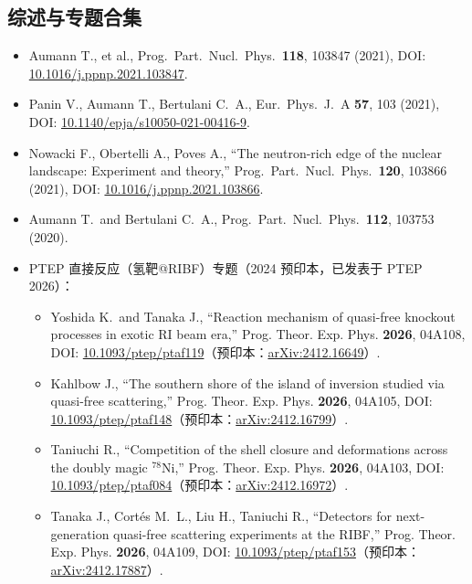 \documentclass[a4paper, 11pt]{article}
\begin{document}
\subsection{综述与专题合集}
\begin{itemize}
  \item Aumann T., et al., Prog.\ Part.\ Nucl.\ Phys.\ \textbf{118}, 103847 (2021), DOI: \href{https://doi.org/10.1016/j.ppnp.2021.103847}{10.1016/j.ppnp.2021.103847}.
  \item Panin V., Aumann T., Bertulani C.\ A., Eur.\ Phys.\ J.\ A \textbf{57}, 103 (2021), DOI: \href{https://doi.org/10.1140/epja/s10050-021-00416-9}{10.1140/epja/s10050-021-00416-9}.
  \item Nowacki F., Obertelli A., Poves A., ``The neutron-rich edge of the nuclear landscape: Experiment and theory,'' Prog.\ Part.\ Nucl.\ Phys.\ \textbf{120}, 103866 (2021), DOI: \href{https://doi.org/10.1016/j.ppnp.2021.103866}{10.1016/j.ppnp.2021.103866}.
  \item Aumann T.\ and Bertulani C.\ A., Prog.\ Part.\ Nucl.\ Phys.\ \textbf{112}, 103753 (2020).
  \item PTEP 直接反应（氢靶@RIBF）专题（2024 预印本，已发表于 PTEP 2026）：
  \begin{itemize}
    \item Yoshida K.\ and Tanaka J., ``Reaction mechanism of quasi-free knockout processes in exotic RI beam era,'' Prog. Theor. Exp. Phys. \textbf{2026}, 04A108, DOI: \href{https://doi.org/10.1093/ptep/ptaf119}{10.1093/ptep/ptaf119}（预印本：\href{https://arxiv.org/abs/2412.16649}{arXiv:2412.16649}）.
    \item Kahlbow J., ``The southern shore of the island of inversion studied via quasi-free scattering,'' Prog. Theor. Exp. Phys. \textbf{2026}, 04A105, DOI: \href{https://doi.org/10.1093/ptep/ptaf148}{10.1093/ptep/ptaf148}（预印本：\href{https://arxiv.org/abs/2412.16799}{arXiv:2412.16799}）.
    \item Taniuchi R., ``Competition of the shell closure and deformations across the doubly magic $^{78}$Ni,'' Prog. Theor. Exp. Phys. \textbf{2026}, 04A103, DOI: \href{https://doi.org/10.1093/ptep/ptaf084}{10.1093/ptep/ptaf084}（预印本：\href{https://arxiv.org/abs/2412.16972}{arXiv:2412.16972}）.
    \item Tanaka J., Cortés M.\ L., Liu H., Taniuchi R., ``Detectors for next-generation quasi-free scattering experiments at the RIBF,'' Prog. Theor. Exp. Phys. \textbf{2026}, 04A109, DOI: \href{https://doi.org/10.1093/ptep/ptaf153}{10.1093/ptep/ptaf153}（预印本：\href{https://arxiv.org/abs/2412.17887}{arXiv:2412.17887}）.
  \end{itemize}
\end{itemize}
\end{document}
